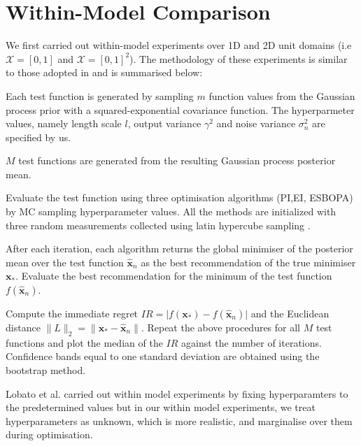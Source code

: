 \documentclass[a4paper,11pt]{report}
\begin{document}
\section{Within-Model Comparison}
We first carried out within-model experiments over 1D and 2D unit domains (i.e $\mathcal{X} =[0, 1]$ and $\mathcal{X} =[0, 1] ^2$). The methodology of these experiments is similar to those adopted in \cite{hernandez2014predictive} \cite{hennig2012entropy} and is summarised below:
\begin{enumerate} [label={[\arabic*]}]
           \item Each test function is generated by sampling $m$ function values from the Gaussian process prior with a squared-exponential covariance function. The hyperparmeter values, namely length scale $ l$, output variance $\gamma^2 $ and noise variance $\sigma_n^2$ are specified by us. 
          \item  $M$ test functions are generated from the resulting Gaussian process posterior mean.
          \item  Evaluate the test function using three optimisation algorithms (PI,EI, ESBOPA) by MC sampling hyperparameter values. All the methods are initialized with three random measurements collected using latin hypercube sampling \cite{brochu2010tutorial}. 
          \item  After each iteration, each algorithm returns the global minimiser of the posterior mean over the test function $\hat{\mathbf{x}}_{n} $ as the best recommendation of the true minimiser $\mathbf{x}_{*}$. Evaluate the best recommendation for the minimum of the test function $f(\hat{\mathbf{x}}_{n})$. 
          \item Compute the immediate regret $IR = \vert f(\mathbf{x}_{*})- f(\hat{\mathbf{x}}_n)\vert $ and the Euclidean distance $ \| L\| _{2} = \| \mathbf{x}_{*} - \hat{\mathbf{x}}_{n} \| $. Repeat the above procedures for all $M$ test functions and plot the median of the $IR$ against the number of iterations. Confidence bands equal to one standard deviation are obtained using the bootstrap method. 
\end{enumerate} 
\noindent
Lobato et al. \cite{hernandez2014predictive} carried out within model experiments by fixing hyperparamters to the predetermined values  but in our within model experiments, we treat hyperparameters as unknown, which is more realistic, and marginalise over them during optimisation.   
\end{document}
